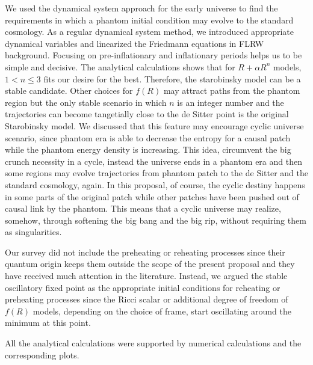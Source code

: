 \documentclass[a4paper,11pt]{article}
\begin{document}
We used the dynamical system approach for the early universe to find the requirements in which a phantom initial condition may evolve to the standard cosmology. As a regular dynamical system method, we introduced appropriate dynamical variables and linearized the Friedmann equations in FLRW background. Focusing on pre-inflationary and inflationary periods helps us to be simple and decisive. The analytical calculations shows that for $R+\alpha R^n$ models, $1<n\le 3$ fits our desire for the best. Therefore, the starobinsky model can be a stable candidate. Other choices for $f(R)$ may attract paths from the phantom region but the only stable scenario in which $n$ is an integer number and the trajectories can become tangetially close to the de Sitter point is the original Starobinsky model. We discussed that this feature may encourage cyclic universe scenario, since phantom era is able to decrease the entropy for a causal patch while the phantom energy density is increasing. This idea, circumvent the big crunch necessity in a cycle, instead the universe ends in a phantom era and then some regions may evolve trajectories from phantom patch to the de Sitter and the standard cosmology, again. In this proposal, of course, the cyclic destiny happens in some parts of the original patch while other patches have been pushed out of causal link by the phantom. This means that a cyclic universe may realize, somehow, through softening the big bang and the big rip, without requiring them as singularities. 


Our survey did not include the preheating or reheating processes since their quantum origin keeps them outside the scope of the present proposal and they have received much attention in the literature. Instead, we argued the stable oscillatory fixed point as the appropriate initial conditions for reheating or preheating processes since the Ricci scalar or additional degree of freedom of $f(R)$ models, depending on the choice of frame,  start oscillating around the minimum at this point. 

All the analytical calculations were supported by numerical calculations and the corresponding plots. 
\end{document}
